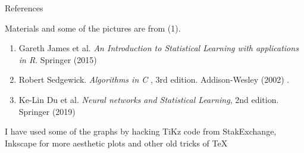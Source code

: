 \documentclass{beamer}
\begin{document}
	\begin{frame}{References}
		
		Materials and some of the pictures are from (1). 
		\begin{enumerate}
			\item Gareth James et al. {\it An Introduction to Statistical Learning with applications in R}. Springer (2015)
			\item Robert Sedgewick. {\it Algorithms in C }, 3rd edition. Addison-Wesley (2002) . 
			\item Ke-Lin Du et al. {\it Neural networks and Statistical Learning}, 2nd edition. Springer (2019)
			
		\end{enumerate}	
		
		I have used some of the graphs by hacking TiKz code from StakExchange, Inkscape for more aesthetic plots and other old tricks of \TeX
	\end{frame}	
	
	
\end{document}
